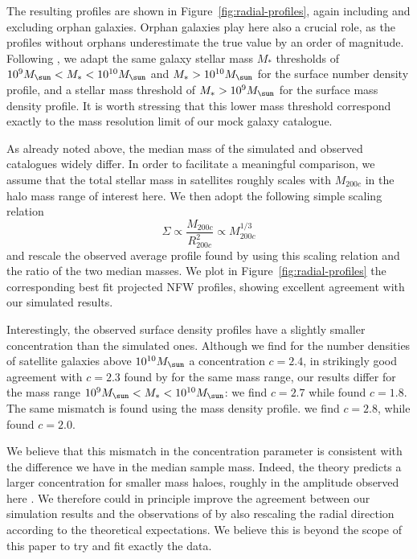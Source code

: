 The resulting profiles  are shown in Figure~\ref{fig:radial-profiles},
again including  and excluding  orphan galaxies. Orphan  galaxies play
here  also   a  crucial   role,  as   the  profiles   without  orphans
underestimate  the true  value by  an order  of magnitude.   Following
\citet{vanderburgEvidenceInsideoutGrowth2015},   we  adapt   the  same
galaxy  stellar   mass  $M_*$  thresholds   of  $10^9\msol  <   M_*  <
10^{10}\msol$ and $M_* > 10^{10}\msol$  for the surface number density
profile, and  a stellar mass threshold  of $M_* > 10^9  \msol$ for the
surface mass  density profile. It  is worth stressing that  this lower
mass threshold correspond exactly to  the mass resolution limit of our
mock galaxy catalogue.

As already noted above, the median  mass of the simulated and observed
catalogues  widely  differ.  In   order  to  facilitate  a  meaningful
comparison,  we  assume that  the  total  stellar mass  in  satellites
roughly  scales with  $M_{200c}$ in  the halo  mass range  of interest
here. We then adopt the following simple scaling relation
\begin{equation}
\Sigma \propto \frac{M_{200c}}{R_{200c}^2} \propto M_{200c}^{1/3}
\end{equation}
and    rescale    the    observed    average    profile    found    by
\citet{vanderburgEvidenceInsideoutGrowth2015}   using   this   scaling
relation  and  the  ratio  of  the  two  median  masses.  We  plot  in
Figure~\ref{fig:radial-profiles} the corresponding best fit projected NFW
profiles, showing excellent agreement with our simulated results.

Interestingly, the  observed surface density profiles  have a slightly
smaller concentration than  the simulated ones.  Although  we find for
the  number densities  of  satellite galaxies  above $10^{10}\msol$  a
concentration $c  = 2.4$,  in strikingly  good agreement  with $c=2.3$
found  by \citet{vanderburgEvidenceInsideoutGrowth2015}  for the  same
mass range, our results differ for the  mass range $10^9 \msol < M_* <
10^{10}        \msol$:       we        find       $c=2.7$        while
\citet{vanderburgEvidenceInsideoutGrowth2015} found  $c=1.8$. The same
mismatch is  found using the  mass density profile.  we  find $c=2.8$,
while \citet{vanderburgEvidenceInsideoutGrowth2015} found $c=2.0$.

We  believe  that this  mismatch  in  the concentration  parameter  is
consistent  with  the   difference  we  have  in   the  median  sample
mass. Indeed, the  theory predicts a larger  concentration for smaller
mass haloes, roughly in the amplitude observed here \citep{zhaoAccurateUniversalModels2009}. 
We therefore  could in principle improve the agreement
between   our    simulation   results   and   the    observations   of
\citet{vanderburgEvidenceInsideoutGrowth2015}  by  also rescaling  the
radial direction according to the theoretical expectations. We believe
this is  beyond the  scope of this  paper to try  and fit  exactly the
data.

